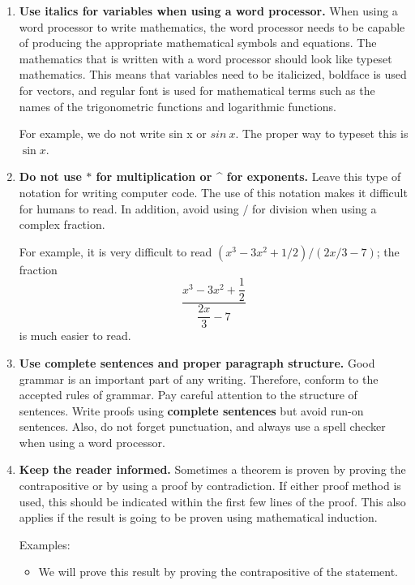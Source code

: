 \begin{enumerate}



\item \textbf{Use italics for variables when using a word processor.}
When using a word processor to write mathematics, the word processor needs to be capable of producing the appropriate mathematical symbols and equations.  The mathematics that is written with a word processor should look like typeset mathematics.  This means that variables need to be italicized, boldface is used for vectors, and regular font is used for mathematical terms such as the names of the trigonometric functions and logarithmic functions.  

For example, we do not write sin x or $sin \: x$.  The proper way to typeset this is $\sin x$.



\item \textbf{Do not use $*$ for multiplication or \^{} for exponents.}
Leave this type of notation for writing computer code.  The use of this notation makes it difficult for humans to read.  In addition, avoid using $/$ for division when using a complex fraction.  

For example, it is very difficult to read 
$\left(x^3 -3x^2 + 1/2 \right)/\left(2x/3 - 7\right)$; the fraction
\[
\frac{x^3 - 3x^2 +\dfrac{1}{2}}{\dfrac{2x}{3} - 7}
\]
is much easier to read.


\item \textbf{Use complete sentences and proper paragraph structure.}
Good grammar is an important part of any writing.  Therefore, conform to the accepted rules of grammar.  Pay careful attention to the structure of sentences.  Write proofs using \textbf{complete sentences} but avoid run-on sentences.  Also, do not forget punctuation, and always use a spell checker when using a word processor.



\item \textbf{Keep the reader informed.} 
Sometimes a theorem is proven by proving the contrapositive or by using a proof by contradiction.  If either proof method is used, this should be indicated within the first few lines of the proof.  This also applies if the result is going to be proven using mathematical induction.

Examples:
\begin{itemize}
\item We will prove this result by proving the contrapositive of the statement.


\end{itemize}
\end{enumerate}
